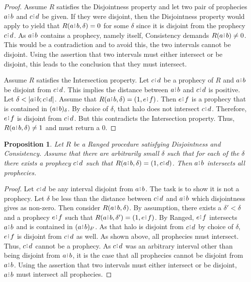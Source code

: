 \documentclass[12pt]{article}
\newtheorem{proposition}{Proposition}[section]
\begin{document}
\begin{proof}
    Assume $R$ satisfies the Disjointness property and let two pair of prophecies $a \rint b$ and $c \rint d$ be given.  If they were disjoint, then the Disjointness property would apply to yield that $R(a\rint b, \delta)= 0$ for some $\delta$ since it is disjoint from the prophecy $c \rint d$. As $a\rint b$ contains a prophecy, namely itself, Consistency demands $R(a\rint b) \neq 0$. This would be a contradiction and to avoid this, the two intervals cannot be disjoint. Using the assertion that two intervals must either intersect or be disjoint, this leads to the conclusion that they must intersect. 

    Assume $R$ satisfies the Intersection property. Let $c \rint d$ be a prophecy of $R$ and $a \rint b$ be disjoint from $c \rint d$. This implies the distance between $a \rint b$ and $c \rint d$ is positive. Let $\delta < |a \rint b; c \rint d|$. Assume that $R(a \rint b,\delta) = (1, e \rint f)$. Then $e \rint f$ is a prophecy that is contained in $\halo{a \rint b}$. By choice of $\delta$, that halo does not intersect $c \rint d$. Therefore, $e \rint f$ is disjoint from $c \rint d$. But this contradicts the Intersection property. Thus, $R(a \rint b, \delta) \neq 1$ and must return a $0$. 
\end{proof}


\begin{proposition}
    Let $R$ be a Ranged procedure satisfying Disjointness and Consistency. Assume that there are arbitrarily small $\delta$ such that for each of the $\delta$ there exists a prophecy $c\rint d$ such that $R(a \rint b, \delta) = (1, c\rint d)$. Then $a\rint b$ intersects all prophecies. 
\end{proposition}

\begin{proof}
     Let $c\rint d$ be any interval disjoint from $a\rint b$. The task is to show it is not a prophecy. Let $\delta$ be less than the distance between $c \rint d$ and $a \rint b$ which disjointness gives as non-zero. Then consider $R(a \rint b, \delta)$. By assumption, there exists a $\delta' < \delta$ and a prophecy $e \rint f$ such that $R(a \rint b, \delta') = (1, e \rint f)$. By Ranged, $e \rint f$ intersects $a \rint b$ and is contained in $\halo[\delta']{a \rint b}$. As that halo is disjoint from $c \rint d$ by choice of $\delta$, $e \rint f$ is disjoint from $c\rint d$ as well. As shown above, all prophecies must intersect. Thus, $c\rint d$ cannot be a prophecy. As $c\rint d$ was an arbitrary interval other than being disjoint from $a\rint b$, it is the case that all prophecies cannot be disjoint from $a\rint b$. Using the assertion that two intervals must either intersect or be disjoint, $a\rint b$ must intersect all prophecies.
\end{proof}
\end{document}
